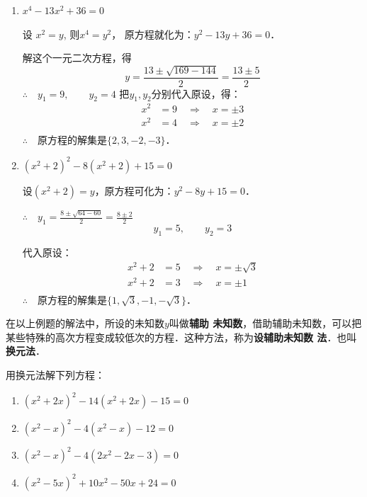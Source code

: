\begin{solution}
\begin{enumerate}
    \item $x^4-13x^2+36=0$

    设 $x^2=y$, 则$x^4=y^2$，
    原方程就化为：$y^2-13y+36=0$．

    解这个一元二次方程，得
\[y=\frac{13\pm \sqrt{169-144}}{2}=\frac{13\pm 5}{2}\]
$\therefore\quad y_1=9,\qquad y_2=4$
把$y_1,y_2$分别代入原设，得：
\begin{align*}
    x^2&=9 \quad \Rightarrow\quad  x=\pm 3\\
    x^2&=4 \quad \Rightarrow\quad  x=\pm 2\\
\end{align*}
$\therefore\quad $原方程的解集是$\{2,3,-2,-3\}$．

\item $(x^2+2)^2-8(x^2+2)+15=0$

设$(x^2+2)=y$，原方程可化为：$y^2-8y+15=0$．

$\therefore\quad y_1=\frac{8\pm\sqrt{64-60}}{2}=\frac{8\pm 2}{2}$
\[y_1=5,\qquad y_2=3\]

代入原设：
\begin{align*}
    x^2+2&=5 \quad \Rightarrow\quad  x=\pm\sqrt{3}\\
    x^2+2&=3 \quad \Rightarrow\quad  x=\pm 1\\
\end{align*}
$\therefore\quad $原方程的解集是$\{1,\sqrt{3},-1,-\sqrt{3}\}$．

\end{enumerate}    
\end{solution}

在以上例题的解法中，所设的未知数$y$叫做\textbf{辅助
未知数}，借助辅助未知数，可以把某些特殊的高次方程变成较低次的方程．这种方法，称为\textbf{设辅助未知数
法}．也叫\textbf{换元法}．

\begin{ex}
    用换元法解下列方程：
    
\begin{enumerate}
    \item $(x^2+2x)^2-14(x^2+2x)-15=0$
    \item $(x^2-x)^2-4(x^2-x)-12=0$
    \item $(x^2-x)^2-4(2x^2-2x-3)=0$
    \item $(x^2-5x)^2+10x^2-50x+24=0$
\end{enumerate}        
    

\end{ex}

